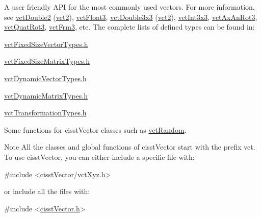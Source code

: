 \begin{DoxyItemize}
\item A user friendly A\-P\-I for the most commonly used vectors. For more information, see \hyperlink{vct_fixed_size_vector_types_8h_afc0fdcc41cbe8b043747612501610812}{vct\-Double2} (\hyperlink{vct_fixed_size_vector_types_8h_a88481ac3c794867ba5e4e92624f0d958}{vct2}), \hyperlink{vct_fixed_size_vector_types_8h_a86116f095b661a1ffb5f630c06ee258d}{vct\-Float3}, \hyperlink{vct_fixed_size_matrix_types_8h_a7278d810c510a7a8ebd38de1c8d80970}{vct\-Double3x3} (\hyperlink{vct_fixed_size_vector_types_8h_a88481ac3c794867ba5e4e92624f0d958}{vct2}), \hyperlink{vct_fixed_size_matrix_types_8h_a59789252579c8ed0c5841af643951107}{vct\-Int3x3}, \hyperlink{vct_transformation_types_8h_ac2733d98f3965180e67f7a21b7ee4582}{vct\-Ax\-An\-Rot3}, \hyperlink{vct_transformation_types_8h_a595c3c83888ed4fb8ae707126efd25e3}{vct\-Quat\-Rot3}, \hyperlink{vct_transformation_types_8h_a81feda0a02c2d1bc26e5553f409fed20}{vct\-Frm3}, etc. The complete lists of defined types can be found in\-: 
\begin{DoxyItemize}
\item \hyperlink{vct_fixed_size_vector_types_8h}{vct\-Fixed\-Size\-Vector\-Types.\-h} 
\item \hyperlink{vct_fixed_size_matrix_types_8h}{vct\-Fixed\-Size\-Matrix\-Types.\-h} 
\item \hyperlink{vct_dynamic_vector_types_8h}{vct\-Dynamic\-Vector\-Types.\-h} 
\item \hyperlink{vct_dynamic_matrix_types_8h}{vct\-Dynamic\-Matrix\-Types.\-h} 
\item \hyperlink{vct_transformation_types_8h}{vct\-Transformation\-Types.\-h} 
\end{DoxyItemize}
\item Some functions for cisst\-Vector classes such as \hyperlink{group__cisst_vector_ga515b69d58d116cfb3465c9bb6b9e05dc}{vct\-Random}.
\end{DoxyItemize}

\begin{DoxyNote}{Note}
All the classes and global functions of cisst\-Vector start with the prefix vct. To use cisst\-Vector, you can either include a specific file with\-: 
\begin{DoxyCode}
\textcolor{preprocessor}{#include <cisstVector/vctXyz.h>}
\end{DoxyCode}
 or include all the files with\-: 
\begin{DoxyCode}
\textcolor{preprocessor}{#include <\hyperlink{cisst_vector_8h}{cisstVector.h}>}
\end{DoxyCode}
 
\end{DoxyNote}


